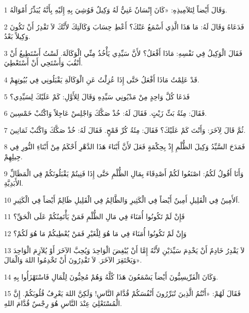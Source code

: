 \par 1 وَقَالَ أَيْضاً لِتَلاَمِيذِهِ: «كَانَ إِنْسَانٌ غَنِيٌّ لَهُ وَكِيلٌ فَوُشِيَ بِهِ إِلَيْهِ بِأَنَّهُ يُبَذِّرُ أَمْوَالَهُ.
\par 2 فَدَعَاهُ وَقَالَ لَهُ: مَا هَذَا الَّذِي أَسْمَعُ عَنْكَ؟ أَعْطِ حِسَابَ وَكَالَتِكَ لأَنَّكَ لاَ تَقْدِرُ أَنْ تَكُونَ وَكِيلاً بَعْدُ.
\par 3 فَقَالَ الْوَكِيلُ فِي نَفْسِهِ: مَاذَا أَفْعَلُ؟ لأَنَّ سَيِّدِي يَأْخُذُ مِنِّي الْوَكَالَةَ. لَسْتُ أَسْتَطِيعُ أَنْ أَنْقُبَ وَأَسْتَحِي أَنْ أَسْتَعْطِيَ.
\par 4 قَدْ عَلِمْتُ مَاذَا أَفْعَلُ حَتَّى إِذَا عُزِلْتُ عَنِ الْوَكَالَةِ يَقْبَلُونِي فِي بُيُوتِهِمْ.
\par 5 فَدَعَا كُلَّ وَاحِدٍ مِنْ مَدْيُونِي سَيِّدِهِ وَقَالَ لِلأَوَّلِ: كَمْ عَلَيْكَ لِسَيِّدِي؟
\par 6 فَقَالَ: مِئَةُ بَثِّ زَيْتٍ. فَقَالَ لَهُ: خُذْ صَكَّكَ وَاجْلِسْ عَاجِلاً وَاكْتُبْ خَمْسِينَ.
\par 7 ثُمَّ قَالَ لِآخَرَ: وَأَنْتَ كَمْ عَلَيْكَ؟ فَقَالَ: مِئَةُ كُرِّ قَمْحٍ. فَقَالَ لَهُ: خُذْ صَكَّكَ وَاكْتُبْ ثَمَانِينَ.
\par 8 فَمَدَحَ السَّيِّدُ وَكِيلَ الظُّلْمِ إِذْ بِحِكْمَةٍ فَعَلَ لأَنَّ أَبْنَاءَ هَذَا الدَّهْرِ أَحْكَمُ مِنْ أَبْنَاءِ النُّورِ فِي جِيلِهِمْ.
\par 9 وَأَنَا أَقُولُ لَكُمُ: اصْنَعُوا لَكُمْ أَصْدِقَاءَ بِمَالِ الظُّلْمِ حَتَّى إِذَا فَنِيتُمْ يَقْبَلُونَكُمْ فِي الْمَظَالِّ الأَبَدِيَّةِ.
\par 10 اَلأَمِينُ فِي الْقَلِيلِ أَمِينٌ أَيْضاً فِي الْكَثِيرِ وَالظَّالِمُ فِي الْقَلِيلِ ظَالِمٌ أَيْضاً فِي الْكَثِيرِ.
\par 11 فَإِنْ لَمْ تَكُونُوا أُمَنَاءَ فِي مَالِ الظُّلْمِ فَمَنْ يَأْتَمِنُكُمْ عَلَى الْحَقِّ؟
\par 12 وَإِنْ لَمْ تَكُونُوا أُمَنَاءَ فِي مَا هُوَ لِلْغَيْرِ فَمَنْ يُعْطِيكُمْ مَا هُوَ لَكُمْ؟
\par 13 لاَ يَقْدِرُ خَادِمٌ أَنْ يَخْدِمَ سَيِّدَيْنِ لأَنَّهُ إِمَّا أَنْ يُبْغِضَ الْوَاحِدَ وَيُحِبَّ الآخَرَ أَوْ يُلاَزِمَ الْوَاحِدَ وَيَحْتَقِرَ الآخَرَ. لاَ تَقْدِرُونَ أَنْ تَخْدِمُوا اللهَ وَالْمَالَ».
\par 14 وَكَانَ الْفَرِّيسِيُّونَ أَيْضاً يَسْمَعُونَ هَذَا كُلَّهُ وَهُمْ مُحِبُّونَ لِلْمَالِ فَاسْتَهْزَأُوا بِهِ.
\par 15 فَقَالَ لَهُمْ: «أَنْتُمُ الَّذِينَ تُبَرِّرُونَ أَنْفُسَكُمْ قُدَّامَ النَّاسِ! وَلَكِنَّ اللهَ يَعْرِفُ قُلُوبَكُمْ. إِنَّ الْمُسْتَعْلِيَ عِنْدَ النَّاسِ هُوَ رِجْسٌ قُدَّامَ اللهِ.
